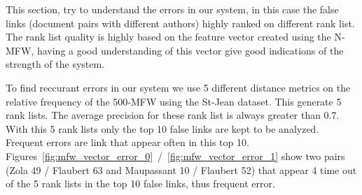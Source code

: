 This section, try to understand the errors in our system, in this case the false links (document pairs with different authors) highly ranked on different rank list.
The rank list quality is highly based on the feature vector created using the N-MFW, having a good understanding of this vector give good indications of the strength of the system.

To find reccurant errors in our system we use 5 different distance metrics on the relative frequency of the 500-MFW using the St-Jean dataset.
This generate 5 rank lists.
The average precision for these rank list is always greater than 0.7.
With this 5 rank lists only the top 10 false links are kept to be analyzed.
Frequent errors are link that appear often in this top 10.
Figures~\ref{fig:mfw_vector_error_0}~/~\ref{fig:mfw_vector_error_1} show two pairs (Zola 49 / Flaubert 63 and Maupassant 10 / Flaubert 52) that appear 4 time out of the 5 rank lists in the top 10 false links, thus frequent error.


